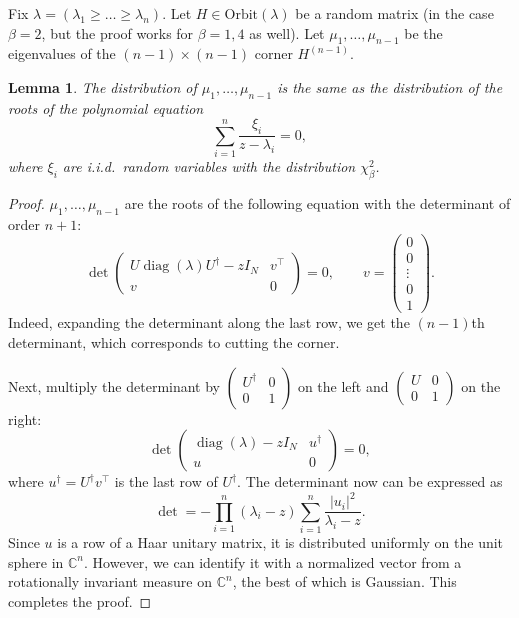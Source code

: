 \documentclass[letterpaper,11pt,oneside,reqno]{book}
\numberwithin{equation}{chapter}  %
\newtheorem{lemma}[proposition]{Lemma}
\theoremstyle{definition}
\begin{document}
Fix $\lambda=(\lambda_1\ge \ldots \ge \lambda_n )$.
Let $H\in \mathrm{Orbit}(\lambda)$ be a random matrix
(in the case $\beta=2$, but the proof works for $\beta=1,4$ as well).
Let $\mu_1,\ldots,\mu_{n-1}$ be the eigenvalues of the $(n-1)\times(n-1)$ corner $H^{(n-1)}$.
\begin{lemma}
	\label{lecture7:lemma:corner_step}
	The distribution of $\mu_1,\ldots,\mu_{n-1}$ is the same as the distribution of
	the roots of the polynomial equation
	\begin{equation}
		\label{lecture7:eq:polynomial_equation}
		\sum_{i=1}^n \frac{\xi_i}{z-\lambda_i}=0,
	\end{equation}
	where $\xi_i$ are i.i.d.\ random variables with the distribution $\chi^2_\beta$.
\end{lemma}
\begin{proof}
	$\mu_1,\ldots,\mu_{n-1} $ are the roots of the following
	equation with the determinant of
	order $n+1$:
	\begin{equation*}
		\det\begin{pmatrix}
			U\operatorname{\mathrm{diag}}(\lambda)U^\dagger-z I_N & v^\top\\
			v & 0
		\end{pmatrix}=0,
		\qquad
		v=\begin{pmatrix}
			0\\0\\\vdots\\0\\1
		\end{pmatrix}.
	\end{equation*}
	Indeed, expanding the determinant along the last row, we get the $(n-1)$th
	determinant, which corresponds to cutting the corner.

	Next, multiply the determinant by $\begin{pmatrix} U^\dagger&0\\0&1 \end{pmatrix}$
	on the left
	and $\begin{pmatrix} U & 0\\0&1 \end{pmatrix}$ on the right:
	\begin{equation*}
		\det\begin{pmatrix}
			\operatorname{\mathrm{diag}}(\lambda)-z I_N & u^\dagger\\
			u & 0
		\end{pmatrix}=0,
	\end{equation*}
	where $u^\dagger=U^\dagger v^\top$ is the last row of $U^\dagger$.
	The determinant now can be expressed as
	\begin{equation*}
		\det=-\prod_{i=1}^n(\lambda_i-z)\sum_{i=1}^{n}\frac{|u_i|^2}{\lambda_i-z}.
	\end{equation*}
	Since $u$ is a row of a Haar unitary matrix,
	it is distributed uniformly on the unit sphere in $\mathbb{C}^n$.
	However, we can identify it with a normalized vector from a
	rotationally invariant measure on $\mathbb{C}^n$,
	the best of which is Gaussian.
	This completes the proof.
\end{proof}
\end{document}
